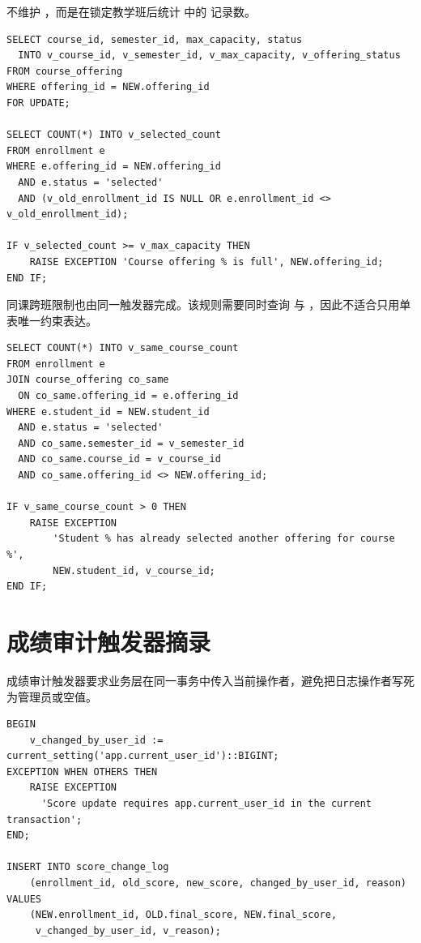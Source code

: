  不维护 ，而是在锁定教学班后统计  中的  记录数。

\begin{lstlisting}[style=sqlstyle]
SELECT course_id, semester_id, max_capacity, status
  INTO v_course_id, v_semester_id, v_max_capacity, v_offering_status
FROM course_offering
WHERE offering_id = NEW.offering_id
FOR UPDATE;

SELECT COUNT(*) INTO v_selected_count
FROM enrollment e
WHERE e.offering_id = NEW.offering_id
  AND e.status = 'selected'
  AND (v_old_enrollment_id IS NULL OR e.enrollment_id <> v_old_enrollment_id);

IF v_selected_count >= v_max_capacity THEN
    RAISE EXCEPTION 'Course offering % is full', NEW.offering_id;
END IF;
\end{lstlisting}

同课跨班限制也由同一触发器完成。该规则需要同时查询  与 ，因此不适合只用单表唯一约束表达。

\begin{lstlisting}[style=sqlstyle]
SELECT COUNT(*) INTO v_same_course_count
FROM enrollment e
JOIN course_offering co_same
  ON co_same.offering_id = e.offering_id
WHERE e.student_id = NEW.student_id
  AND e.status = 'selected'
  AND co_same.semester_id = v_semester_id
  AND co_same.course_id = v_course_id
  AND co_same.offering_id <> NEW.offering_id;

IF v_same_course_count > 0 THEN
    RAISE EXCEPTION
        'Student % has already selected another offering for course %',
        NEW.student_id, v_course_id;
END IF;
\end{lstlisting}

\section{成绩审计触发器摘录}

成绩审计触发器要求业务层在同一事务中传入当前操作者，避免把日志操作者写死为管理员或空值。

\begin{lstlisting}[style=sqlstyle]
BEGIN
    v_changed_by_user_id := current_setting('app.current_user_id')::BIGINT;
EXCEPTION WHEN OTHERS THEN
    RAISE EXCEPTION
      'Score update requires app.current_user_id in the current transaction';
END;

INSERT INTO score_change_log
    (enrollment_id, old_score, new_score, changed_by_user_id, reason)
VALUES
    (NEW.enrollment_id, OLD.final_score, NEW.final_score,
     v_changed_by_user_id, v_reason);
\end{lstlisting}

